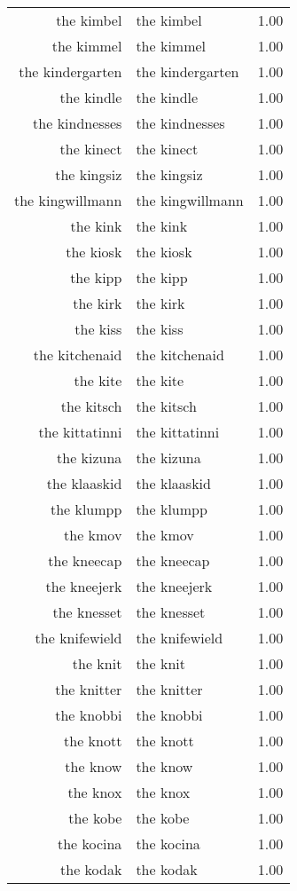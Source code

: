 \begin{table}[ht]
\begin{tabular}{rlr}
  the kimbel & the kimbel & 1.00 \\ 
  the kimmel & the kimmel & 1.00 \\ 
  the kindergarten & the kindergarten & 1.00 \\ 
  the kindle & the kindle & 1.00 \\ 
  the kindnesses & the kindnesses & 1.00 \\ 
  the kinect & the kinect & 1.00 \\ 
  the kingsiz & the kingsiz & 1.00 \\ 
  the kingwillmann & the kingwillmann & 1.00 \\ 
  the kink & the kink & 1.00 \\ 
  the kiosk & the kiosk & 1.00 \\ 
  the kipp & the kipp & 1.00 \\ 
  the kirk & the kirk & 1.00 \\ 
  the kiss & the kiss & 1.00 \\ 
  the kitchenaid & the kitchenaid & 1.00 \\ 
  the kite & the kite & 1.00 \\ 
  the kitsch & the kitsch & 1.00 \\ 
  the kittatinni & the kittatinni & 1.00 \\ 
  the kizuna & the kizuna & 1.00 \\ 
  the klaaskid & the klaaskid & 1.00 \\ 
  the klumpp & the klumpp & 1.00 \\ 
  the kmov & the kmov & 1.00 \\ 
  the kneecap & the kneecap & 1.00 \\ 
  the kneejerk & the kneejerk & 1.00 \\ 
  the knesset & the knesset & 1.00 \\ 
  the knifewield & the knifewield & 1.00 \\ 
  the knit & the knit & 1.00 \\ 
  the knitter & the knitter & 1.00 \\ 
  the knobbi & the knobbi & 1.00 \\ 
  the knott & the knott & 1.00 \\ 
  the know & the know & 1.00 \\ 
  the knox & the knox & 1.00 \\ 
  the kobe & the kobe & 1.00 \\ 
  the kocina & the kocina & 1.00 \\ 
  the kodak & the kodak & 1.00 \\ 

\end{tabular}
\end{table}
